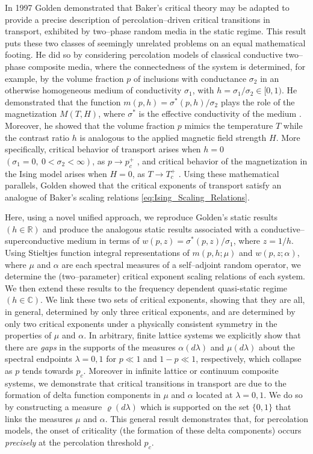 \documentclass[english,12pt,jmp,graphicx]{revtex4-1}
\begin{document}
In 1997 Golden \cite{Golden:PRL-3935} demonstrated that Baker's critical theory may be
adapted to provide a precise description of percolation--driven
critical transitions in transport, exhibited by two--phase random
media in the static regime. This 
result puts these two classes of seemingly unrelated problems
on an equal mathematical footing. He did so by considering percolation
models of classical conductive two--phase composite media, where the
connectedness of the system is determined, for example, by the volume fraction $p$
of inclusions with conductance $\sigma_2$ in an otherwise
homogeneous medium of conductivity $\sigma_1$, with $h=\sigma_1/\sigma_2\in[0,1)$.
He demonstrated that the function $m(p,h)=\sigma^*(p,h)/\sigma_2$ plays the role
of the magnetization  $M(T,H)$, where $\sigma^*$ is the effective
conductivity of the medium
\cite{Bergman:PRC-377,Milton:APL-300,Golden:CMP-473}. Moreover, he 
showed that the volume fraction $p$ mimics the temperature $T$ while
the contrast ratio $h$ is analogous to the applied magnetic field strength $H$. 
More specifically, critical behavior of transport
arises when $h=0$ $(\sigma_1=0, \ 0<\sigma_2<\infty)$, as $p\to p_c^+$
\cite{Golden:PRL-3935}, and 
critical behavior of the magnetization in the Ising model 
arises when $H=0$, as $T\to T_c^+$
\cite{Christensen-2005}. Using these mathematical
parallels, Golden showed that the critical exponents of transport
satisfy an analogue of Baker's %
scaling relations \eqref{eq:Ising_Scaling_Relations}.

Here, using a novel unified approach, we reproduce Golden's
static results $(h\in\mathbb{R})$ and produce the analogous
static results associated with a conductive--superconductive medium in
terms of $w(p,z)=\sigma^*(p,z)/\sigma_1$, where $z=1/h$. Using Stieltjes
function integral representations of $m(p,h;\mu)$ and $w(p,z;\alpha)$, where
$\mu$ and $\alpha$ are each spectral measures of a self--adjoint random operator, we
determine the (two--parameter) critical exponent scaling relations of each
system. We then extend these results to the frequency dependent
quasi-static regime $(h\in\mathbb{C})$. We link these two sets of
critical exponents, showing that they are all, in general, determined
by only three critical exponents, and are determined by only two
critical exponents under a physically consistent symmetry in the
properties of $\mu$ and $\alpha$. In arbitrary, finite lattice systems we
explicitly show that there are \emph{gaps} in the supports of the measures
$\alpha(d\lambda)$ and $\mu(d\lambda)$ about the spectral endpoints $\lambda=0,1$ for $p\ll1$ and
$1-p\ll1$, respectively, which collapse as $p$ tends towards
$p_c$. Moreover in infinite lattice or continuum composite systems, we
demonstrate that critical transitions in transport are due to the
formation of delta function components in $\mu$ and $\alpha$ located at
$\lambda=0,1$. We do so by constructing a measure $\varrho(d\lambda)$ which is supported
on the set $\{0,1\}$ that links the measures $\mu$ and $\alpha$. This general
result demonstrates that, for percolation models, the onset of
criticality (the formation of these delta components) occurs
\emph{precisely} at the percolation threshold $p_c$.  
%
%
%
\end{document}
